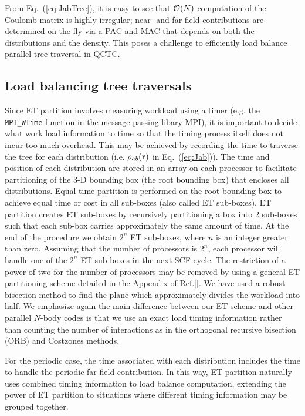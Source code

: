 \commentoutA{\documentclass[prl,aps,twocolumn,twocolumngrid,superbib]{revtex4}}
\begin{document}
From Eq.~(\ref{eq:JabTree}), it is easy to see that ${\cal O}(N)$
computation of the Coulomb matrix is highly irregular; near- and
far-field contributions are determined on the fly via a PAC and MAC
that depends on both the distributions and the density. This poses a
challenge to efficiently load balance parallel tree traversal in QCTC.


\subsection{Load balancing tree traversals}
\label{ETPartition}
Since ET partition involves measuring workload using a timer (e.g. the
{\tt MPI\_WTime} function in the message-passing libary
MPI\cite{mpi}), it is important to decide what work load information
to time so that the timing process itself does not incur too much
overhead.  This may be achieved by recording the time to traverse the
tree for each distribution (i.e. $\rho_{ab}({\bf r})$ in
Eq.~(\ref{eq:Jab})). The time and position of each distribution are
stored in an array on each processor to facilitate partitioning of the
3-D bounding box (the root bounding box) that encloses all
distributions. Equal time partition\cite{CGan03} is performed on the
root bounding box to achieve equal time or cost in all sub-boxes (also
called ET sub-boxes).  ET partition creates ET sub-boxes by
recursively partitioning a box into 2 sub-boxes such that each sub-box
carries approximately the same amount of time. At the end of the
procedure we obtain $2^n$ ET sub-boxes, where $n$ is an integer
greater than zero.  Assuming that the number of processors is $2^n$,
each processor will handle one of the $2^n$ ET sub-boxes in the next
SCF cycle.  The restriction of a power of two for the number of
processors may be removed by using a general ET partitioning scheme
detailed in the Appendix of Ref.[].  We have used a
robust bisection method\cite{WPress92} to find the plane which
approximately divides the workload into half.  We emphasize again the
main difference between our ET scheme and other parallel $N$-body
codes\cite{MWarren92,Singh93} is that we use an exact load timing
information rather than counting the number of interactions as in the
orthogonal recursive bisection (ORB)\cite{MWarren92} and Costzones
methods\cite{Singh93}.

For the periodic case, the time associated with each distribution
includes the time to handle the periodic far
field\cite{MChallacombe97D,CTymczak04a} contribution. In this way, ET
partition naturally uses combined timing information to load balance
computation, extending the power of ET partition to situations where
different timing information may be grouped together.
\end{document}
